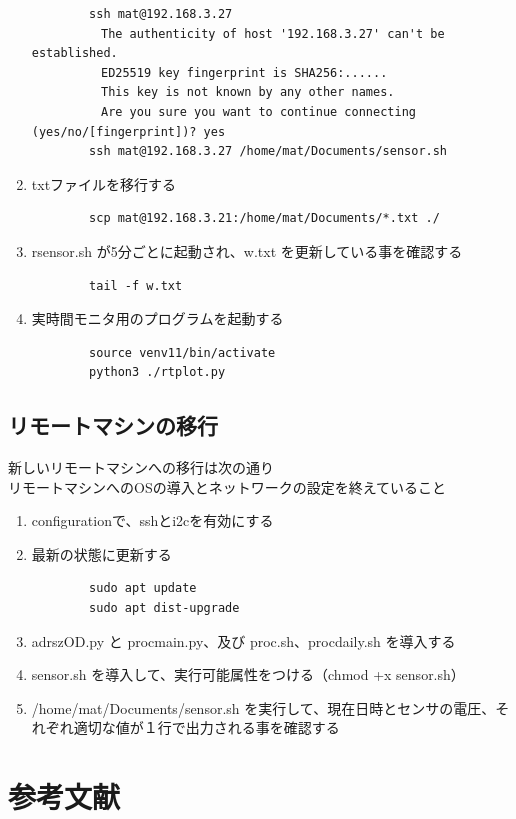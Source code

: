 \documentclass[12pt,a4paper,uplatex]{jsarticle}
\begin{document}
\begin{enumerate}
	\begin{verbatim}
		ssh mat@192.168.3.27
		　The authenticity of host '192.168.3.27' can't be established.
		　ED25519 key fingerprint is SHA256:......
		　This key is not known by any other names.
		　Are you sure you want to continue connecting (yes/no/[fingerprint])? yes
		ssh mat@192.168.3.27 /home/mat/Documents/sensor.sh
	\end{verbatim}
	\item txtファイルを移行する
	\begin{verbatim}
		scp mat@192.168.3.21:/home/mat/Documents/*.txt ./
	\end{verbatim}
	\item rsensor.sh が5分ごとに起動され、w.txt を更新している事を確認する
	\begin{verbatim}
		tail -f w.txt
	\end{verbatim}
	\item 実時間モニタ用のプログラムを起動する
	\begin{verbatim}
		source venv11/bin/activate
		python3 ./rtplot.py
	\end{verbatim}
\end{enumerate}

\subsection{リモートマシンの移行}

新しいリモートマシンへの移行は次の通り\\リモートマシンへのOSの導入とネットワークの設定を終えていること

\begin{enumerate}
	\item configurationで、sshとi2cを有効にする
	\item 最新の状態に更新する
	\begin{verbatim}
		sudo apt update
		sudo apt dist-upgrade
	\end{verbatim}
	\item adrszOD.py と procmain.py、及び proc.sh、procdaily.sh を導入する
	\item sensor.sh を導入して、実行可能属性をつける（chmod +x sensor.sh）
	\item /home/mat/Documents/sensor.sh を実行して、現在日時とセンサの電圧、それぞれ適切な値が１行で出力される事を確認する
\end{enumerate}


\section{参考文献}
\end{document}
